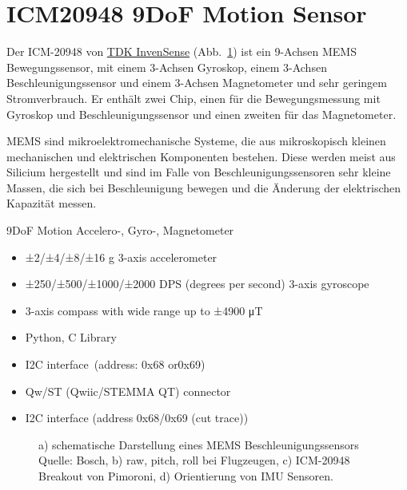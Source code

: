 \documentclass[
  11pt,
  a4paperpaper,
  oneside, openany  ,captions=tableheading
]{scrbook}
\providecommand{\tightlist}{%
  \setlength{\itemsep}{0pt}\setlength{\parskip}{0pt}}
\theoremstyle{definition}
\theoremstyle{remark}
\begin{document}
\section{\texorpdfstring{ICM20948 9DoF Motion
Sensor}{ICM20948 9DoF Motion Sensor}}\label{icm20948-9dof-motion-sensor}

Der ICM-20948 von
\href{https://invensense.tdk.com/products/motion-tracking/9-axis/icm-20948}{TDK
InvenSense} (Abb.~\ref{fig-icm20948}) ist ein 9-Achsen MEMS
Bewegungssensor, mit einem 3-Achsen Gyroskop, einem 3-Achsen
Beschleunigungssensor und einem 3-Achsen Magnetometer und sehr geringem
Stromverbrauch. Er enthält zwei Chip, einen für die Bewegungsmessung mit
Gyroskop und Beschleunigungssensor und einen zweiten für das
Magnetometer.

MEMS sind mikroelektromechanische Systeme, die aus
mikroskopisch kleinen mechanischen und elektrischen Komponenten
bestehen. Diese werden meist aus Silicium hergestellt und sind im Falle
von Beschleunigungssensoren sehr kleine Massen, die sich bei
Beschleunigung bewegen und die Änderung der elektrischen Kapazität
messen.

9DoF Motion Accelero-, Gyro-, Magnetometer

\begin{itemize}
\tightlist
\item
  ±2/±4/±8/±16 g 3-axis accelerometer
\item
  ±250/±500/±1000/±2000 DPS (degrees per second) 3-axis gyroscope
\item
  3-axis compass with wide range up to ±4900 μT
\item
  Python, C Library
\item
  I2C interface~(address: 0x68 or0x69)
\item
  Qw/ST (Qwiic/STEMMA QT) connector
\item
  I2C interface (address 0x68/0x69 (cut trace))
\end{itemize}

\begin{figure}


\caption{\label{fig-icm20948}a) schematische Darstellung eines MEMS
Beschleunigungssensors Quelle: Bosch, b) raw, pitch, roll bei
Flugzeugen, c) ICM-20948 Breakout von Pimoroni, d) Orientierung von IMU
Sensoren.}

\end{figure}%
\end{document}
